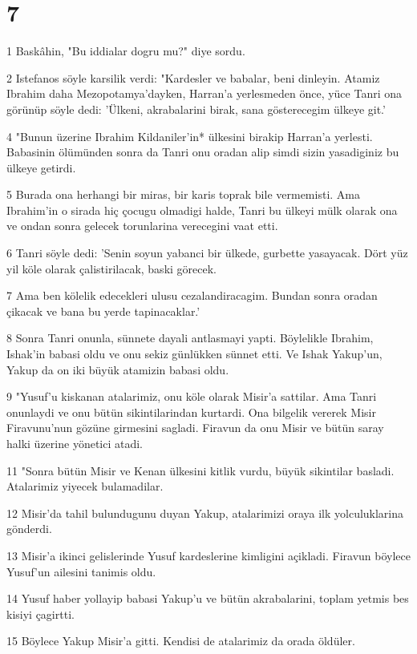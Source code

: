 \chapter{7}

\par 1 Baskâhin, "Bu iddialar dogru mu?" diye sordu.
\par 2 Istefanos söyle karsilik verdi: "Kardesler ve babalar, beni dinleyin. Atamiz Ibrahim daha Mezopotamya'dayken, Harran'a yerlesmeden önce, yüce Tanri ona görünüp söyle dedi: 'Ülkeni, akrabalarini birak, sana gösterecegim ülkeye git.'
\par 4 "Bunun üzerine Ibrahim Kildaniler'in* ülkesini birakip Harran'a yerlesti. Babasinin ölümünden sonra da Tanri onu oradan alip simdi sizin yasadiginiz bu ülkeye getirdi.
\par 5 Burada ona herhangi bir miras, bir karis toprak bile vermemisti. Ama Ibrahim'in o sirada hiç çocugu olmadigi halde, Tanri bu ülkeyi mülk olarak ona ve ondan sonra gelecek torunlarina verecegini vaat etti.
\par 6 Tanri söyle dedi: 'Senin soyun yabanci bir ülkede, gurbette yasayacak. Dört yüz yil köle olarak çalistirilacak, baski görecek.
\par 7 Ama ben kölelik edecekleri ulusu cezalandiracagim. Bundan sonra oradan çikacak ve bana bu yerde tapinacaklar.'
\par 8 Sonra Tanri onunla, sünnete dayali antlasmayi yapti. Böylelikle Ibrahim, Ishak'in babasi oldu ve onu sekiz günlükken sünnet etti. Ve Ishak Yakup'un, Yakup da on iki büyük atamizin babasi oldu.
\par 9 "Yusuf'u kiskanan atalarimiz, onu köle olarak Misir'a sattilar. Ama Tanri onunlaydi ve onu bütün sikintilarindan kurtardi. Ona bilgelik vererek Misir Firavunu'nun gözüne girmesini sagladi. Firavun da onu Misir ve bütün saray halki üzerine yönetici atadi.
\par 11 "Sonra bütün Misir ve Kenan ülkesini kitlik vurdu, büyük sikintilar basladi. Atalarimiz yiyecek bulamadilar.
\par 12 Misir'da tahil bulundugunu duyan Yakup, atalarimizi oraya ilk yolculuklarina gönderdi.
\par 13 Misir'a ikinci gelislerinde Yusuf kardeslerine kimligini açikladi. Firavun böylece Yusuf'un ailesini tanimis oldu.
\par 14 Yusuf haber yollayip babasi Yakup'u ve bütün akrabalarini, toplam yetmis bes kisiyi çagirtti.
\par 15 Böylece Yakup Misir'a gitti. Kendisi de atalarimiz da orada öldüler.

